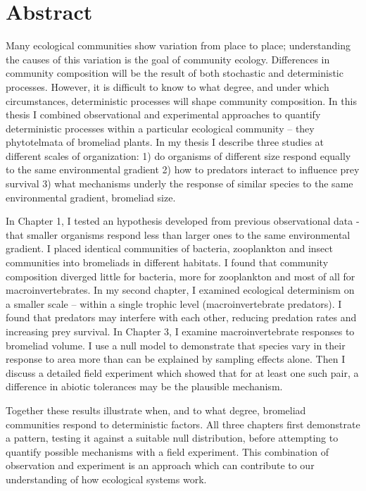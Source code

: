 \chapter*{Abstract}

Many ecological communities show variation from place to place; understanding the causes of this variation is the goal of community ecology. Differences in community composition will be the result of both stochastic and deterministic processes. However, it is difficult to know to what degree, and under which circumstances, deterministic processes will shape community composition. In this thesis I combined observational and experimental approaches to quantify deterministic processes within a particular ecological community -- they phytotelmata of bromeliad plants. In my thesis I describe three studies at different scales of organization: 1) do organisms of different size respond equally to the same environmental gradient 2) how to predators interact to influence prey survival 3) what mechanisms underly the response of similar species to the same environmental gradient, bromeliad size. 

In Chapter 1, I tested an hypothesis developed from previous observational data - that smaller organisms respond less than larger ones to the same environmental gradient. I placed identical communities of bacteria, zooplankton and insect communities into bromeliads in different habitats. I found that community composition diverged little for bacteria, more for zooplankton and most of all for macroinvertebrates. In my second chapter, I examined ecological determinism on a smaller scale -- within a single trophic level (macroinvertebrate predators). I found that predators may interfere with each other, reducing predation rates and increasing prey survival. In Chapter 3, I examine macroinvertebrate responses to bromeliad volume. I use a null model to demonstrate that species vary in their response to area more than can be explained by sampling effects alone. Then I discuss a detailed field experiment which showed that for at least one such pair, a difference in abiotic tolerances may be the plausible mechanism. 

Together these results illustrate when, and to what degree, bromeliad communities respond to deterministic factors. All three chapters first demonstrate a pattern, testing it against a suitable null distribution, before attempting to quantify possible mechanisms with a field experiment. This combination of observation and experiment is an approach which can contribute to our understanding of how ecological systems work. 
